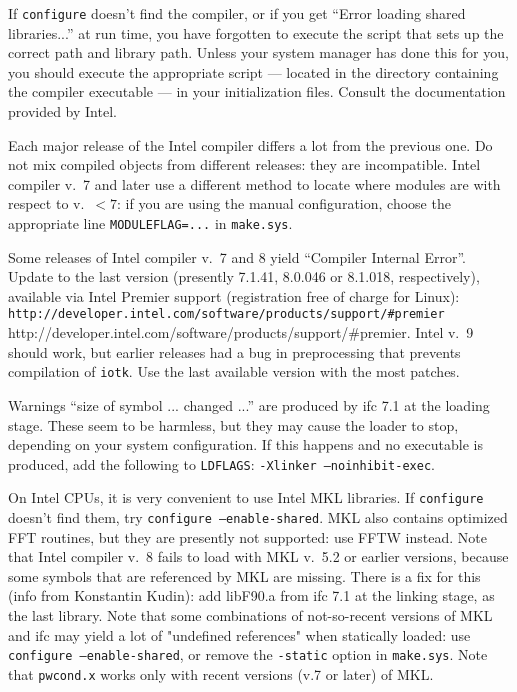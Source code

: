 \documentclass[12pt,a4paper]{article}
\begin{document}
\hfill\break
If \texttt{configure} doesn't find the compiler, or if you get ``Error
loading shared libraries...'' at run time, you have forgotten to
execute the script that sets up the correct path and library path.
Unless your system manager has done this for you, you should execute
the appropriate script --- located in the directory containing the
compiler executable --- in your initialization files.
Consult the documentation provided by Intel. 

Each major release of the Intel compiler differs a lot from
the previous one. Do not mix compiled objects from different releases: 
they are incompatible. Intel compiler v.~7 and later use a different 
method to locate where modules are with respect to v.~$< 7$: if you
are using the manual configuration, choose the appropriate line
\texttt{MODULEFLAG=...} in \texttt{make.sys}.

Some releases of Intel compiler v.~7 and 8 yield ``Compiler Internal 
Error''.
Update to the last version (presently 7.1.41, 8.0.046 or
8.1.018, respectively), available via Intel Premier support 
(registration free of charge for Linux): 
\htmladdnormallink%
{\texttt{http://developer.intel.com/software/products/support/\#premier}}%
{http://developer.intel.com/software/products/support/\#premier}.
\hfill\break
Intel v.~9 should work, but earlier releases had a bug in preprocessing
that prevents compilation of {\tt iotk}. Use the last available version
with the most patches.

Warnings ``size of symbol ... changed ...'' are produced by ifc 7.1 at
the loading stage.
These seem to be harmless, but they may cause the loader to stop,
depending on your system configuration.
If this happens and no executable is produced, add the following to
\texttt{LDFLAGS}: \texttt{-Xlinker --noinhibit-exec}.

On Intel CPUs, it is very convenient to use Intel MKL libraries.
If \texttt{configure} doesn't find them, try
\texttt{configure --enable-shared}.
MKL also contains optimized FFT routines, but they are
presently not supported: use FFTW instead. Note that Intel 
compiler v.~8 fails to load with MKL v.~5.2 or earlier versions,
because some symbols that are referenced by MKL are missing. There
is a fix for this (info from Konstantin Kudin): add libF90.a from 
ifc 7.1 at the linking stage, as the last library.
Note that some combinations of not-so-recent versions of MKL 
and ifc may yield a lot of "undefined references" when statically 
loaded: use \texttt{configure --enable-shared}, 
or remove the \texttt{-static} option in \texttt{make.sys}.
Note that \texttt{pwcond.x} works only with recent versions
(v.7 or later) of MKL.
\end{document}
